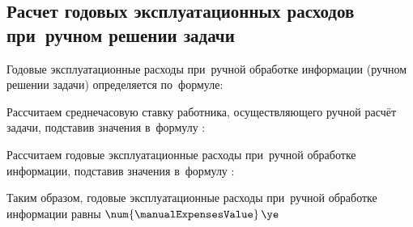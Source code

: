 \subsection{Расчет годовых эксплуатационных расходов при~ручном решении задачи}
\label{sec:economics:manualexpenses}

Годовые эксплуатационные расходы при~ручной обработке информации (ручном решении задачи) определяется по~формуле:
\manualExpensesEquation

Рассчитаем среднечасовую ставку работника, осуществляющего ручной расчёт задачи, подставив значения в~формулу :
\monkerHourRateFormulaApplied

Рассчитаем годовые эксплуатационные расходы при~ручной обработке информации, подставив значения в~формулу :
\manualExpensesFormulaApplied

Таким образом, годовые эксплуатационные расходы при~ручной обработке информации равны \(\num{\manualExpensesValue} \, \ye\)